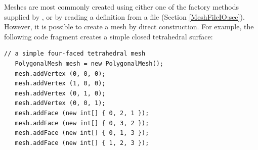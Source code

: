 Meshes are most commonly created using either one of the factory
methods supplied by , or by reading a
definition from a file (Section \ref{MeshFileIO:sec}).  However, it is
possible to create a mesh by direct construction. For example, the
following code fragment creates a simple closed tetrahedral surface:
%
\begin{lstlisting}[]
   // a simple four-faced tetrahedral mesh 
   PolygonalMesh mesh = new PolygonalMesh();
   mesh.addVertex (0, 0, 0);
   mesh.addVertex (1, 0, 0);
   mesh.addVertex (0, 1, 0);
   mesh.addVertex (0, 0, 1);
   mesh.addFace (new int[] { 0, 2, 1 });
   mesh.addFace (new int[] { 0, 3, 2 });
   mesh.addFace (new int[] { 0, 1, 3 });
   mesh.addFace (new int[] { 1, 2, 3 });      
\end{lstlisting}
%


